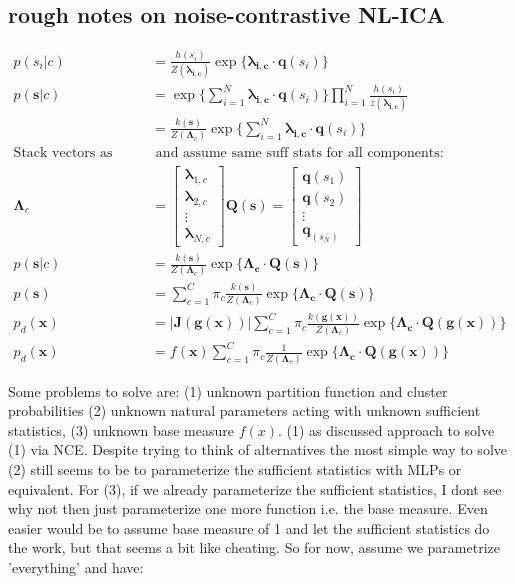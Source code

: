 \documentclass[twoside,11pt]{article}
\newcommand{\q}{\mathbf{q}}
\newcommand{\J}{\mathbf{J}}
\newcommand{\Lambdab}{\boldsymbol{\Lambda}}
\newcommand{\lambdab}{\boldsymbol{\lambda}}
\begin{document}
\subsection{rough notes on noise-contrastive NL-ICA}

\begin{align}
	p(s_i|c) &= \frac{h(s_i)}{Z(\mathbf{\lambda_{i,c}})}   \exp\{\mathbf{\lambdab_{i, c}} \cdot \mathbf{q}(s_i)\}\\
	p(\mathbf{s}|c) &= \exp\{\sum_{i=1}^N \mathbf{\lambdab_{i, c}} \cdot \mathbf{q}(s_i)\} \prod_{i=1}^N \frac{h(s_i)}{z(\mathbf{\lambda_{i,c}})} \\
			&=\frac{k(\mathbf{s})}{Z(\Lambdab_c)}\exp\{\sum_{i=1}^N \mathbf{\lambda_{i, c}}\cdot\mathbf{q}(s_i)\} \\ 
	\text{Stack vectors as follows}&\text{ and assume same suff stats for all components:}\\
	\Lambdab_c &= \begin{bmatrix} \lambdab_{1,c} \\ \lambdab_{2,c} \\ \vdots \\ \lambdab_{N,c} \end{bmatrix} \mathbf{Q(s)}= \begin{bmatrix} \q(s_1) \\ \q(s_2) \\ \vdots \\ \q_(s_N) \end{bmatrix} \\
	p(\mathbf{s}|c) & =\frac{k(\mathbf{s})}{Z(\Lambdab_c)}\exp\{\mathbf{\Lambdab_c}\cdot\mathbf{Q(s)}\} \\
	p(\mathbf{s}) &= \sum_{c=1}^C \pi_c \frac{k(\mathbf{s})}{Z(\Lambdab_c)}\exp\{\mathbf{\Lambdab_c}\cdot\mathbf{Q(s)}\} \\
	p_d(\mathbf{x}) &=|\J\mathbf{(g(x))}| \sum_{c=1}^C \pi_c \frac{k(\mathbf{g(x)})}{Z(\Lambdab_c)}\exp\{\mathbf{\Lambdab_c}\cdot\mathbf{Q(g(x))}\} \\
	p_d(\mathbf{x}) &= f(\mathbf{x}) \sum_{c=1}^C \pi_c \frac{1}{Z(\Lambdab_c)}\exp\{\mathbf{\Lambdab_c}\cdot\mathbf{Q(g(x))}\}
\end{align}

Some problems to solve are: (1) unknown partition function and cluster probabilities (2) unknown natural parameters acting with unknown sufficient statistics, (3) unknown base measure $f(x)$. (1) as discussed approach to solve (1) via NCE. Despite trying to think of alternatives the most simple way to solve (2) still seems to be to parameterize the sufficient statistics with MLPs or equivalent. For (3), if we already parameterize the sufficient statistics, I dont see why not then just parameterize one more function i.e. the base measure. Even easier would be to assume base measure of 1 and let the sufficient statistics do the work, but that seems a bit like cheating. So for now, assume we parametrize 'everything' and have:
\end{document}
